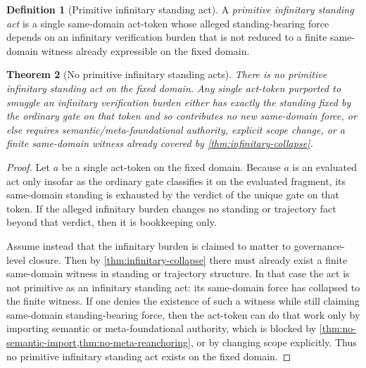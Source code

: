 \documentclass[11pt]{article}
\theoremstyle{plain}
\newtheorem{theorem}{Theorem}[section]
\theoremstyle{definition}
\newtheorem{definition}[theorem]{Definition}
\begin{document}
\begin{definition}[Primitive infinitary standing act]
A \emph{primitive infinitary standing act} is a single same-domain act-token whose alleged standing-bearing force depends on an infinitary verification burden that is not reduced to a finite same-domain witness already expressible on the fixed domain.
\end{definition}

\begin{theorem}[No primitive infinitary standing acts]
\label{thm:no-primitive-infinitary}
There is no primitive infinitary standing act on the fixed domain. Any single act-token purported to smuggle an infinitary verification burden either has exactly the standing fixed by the ordinary gate on that token and so contributes no new same-domain force, or else requires semantic/meta-foundational authority, explicit scope change, or a finite same-domain witness already covered by \cref{thm:infinitary-collapse}.
\end{theorem}

\begin{proof}
Let $a$ be a single act-token on the fixed domain. Because $a$ is an evaluated act only insofar as the ordinary gate classifies it on the evaluated fragment, its same-domain standing is exhausted by the verdict of the unique gate on that token. If the alleged infinitary burden changes no standing or trajectory fact beyond that verdict, then it is bookkeeping only.

Assume instead that the infinitary burden is claimed to matter to governance-level closure. Then by \cref{thm:infinitary-collapse} there must already exist a finite same-domain witness in standing or trajectory structure. In that case the act is not primitive as an infinitary standing act: its same-domain force has collapsed to the finite witness. If one denies the existence of such a witness while still claiming same-domain standing-bearing force, then the act-token can do that work only by importing semantic or meta-foundational authority, which is blocked by \cref{thm:no-semantic-import,thm:no-meta-reanchoring}, or by changing scope explicitly. Thus no primitive infinitary standing act exists on the fixed domain.
\end{proof}
\end{document}
